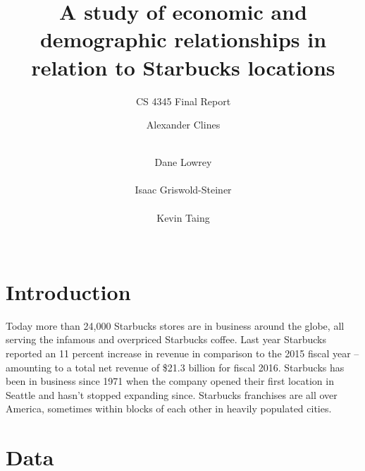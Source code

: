 \documentclass{sigkddExp}
\begin{document}
%

\title{A study of economic and demographic relationships in relation to Starbucks locations}
\subtitle{CS 4345 Final Report}


\author{
\alignauthor Alexander Clines \\
       \\
\and
\alignauthor Dane Lowrey \\
      \\
\alignauthor Isaac Griswold-Steiner \\
      \\
\alignauthor Kevin Taing \\
      \\
}
\date{}

\maketitle

\begin{abstract}
\blindtext
\end{abstract}

\section{Introduction}
Today more than 24,000 Starbucks stores are in business around the globe, all serving the infamous and overpriced Starbucks coffee.\cite{StarbucksNews}
Last year Starbucks reported an 11 percent increase in revenue in comparison to the 2015 fiscal year – amounting to a total net revenue of \$21.3 billion for fiscal 2016.\cite{StarbucksFinances}
Starbucks has been in business since 1971 when the company opened their first location in Seattle and hasn’t stopped expanding since.
Starbucks franchises are all over America, sometimes within blocks of each other in heavily populated cities.

\section{Data}
\end{document}
